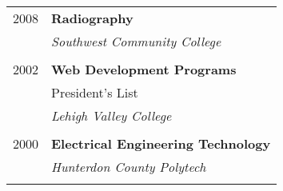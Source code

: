 \documentclass[10pt]{article} %
\begin{document}
\begin{minipage}[t]{0.44\textwidth}
\begin{tabular}{rl}
2008 & \textbf{Radiography} \\ 
& \textit{Southwest Community College}\\
&\\
	 

2002 & \textbf{Web Development Programs} \\ 
& \small President's List \\
& \textit{Lehigh Valley College}\\
&\\
	 

2000 & \textbf{Electrical Engineering Technology}\\
& \textit{Hunterdon County Polytech}\\
&\\
	 



\end{tabular}\\[10pt]	
\end{minipage} %
\end{document}
